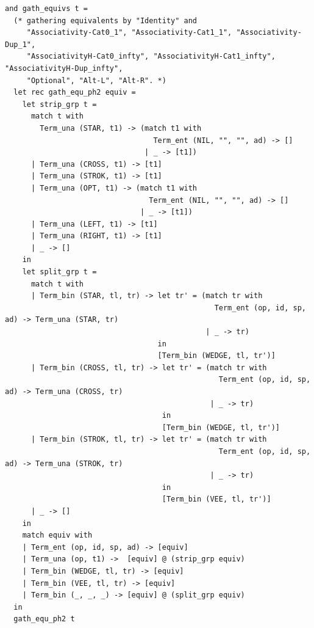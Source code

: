 \documentclass[12pt]{article}
\begin{document}
\begin{tiny}
\begin{verbatim}
and gath_equivs t =
  (* gathering equivalents by "Identity" and
     "Associativity-Cat0_1", "Associativity-Cat1_1", "Associativity-Dup_1",
     "AssociativityH-Cat0_infty", "AssociativityH-Cat1_infty", "AssociativityH-Dup_infty",
     "Optional", "Alt-L", "Alt-R". *)
  let rec gath_equ_ph2 equiv =
    let strip_grp t =
      match t with
        Term_una (STAR, t1) -> (match t1 with
                                  Term_ent (NIL, "", "", ad) -> []
                                | _ -> [t1])
      | Term_una (CROSS, t1) -> [t1]
      | Term_una (STROK, t1) -> [t1]
      | Term_una (OPT, t1) -> (match t1 with
                                 Term_ent (NIL, "", "", ad) -> []
                               | _ -> [t1])
      | Term_una (LEFT, t1) -> [t1]
      | Term_una (RIGHT, t1) -> [t1]
      | _ -> []
    in
    let split_grp t =
      match t with
      | Term_bin (STAR, tl, tr) -> let tr' = (match tr with
                                                Term_ent (op, id, sp, ad) -> Term_una (STAR, tr)
                                              | _ -> tr)
                                   in
                                   [Term_bin (WEDGE, tl, tr')]
      | Term_bin (CROSS, tl, tr) -> let tr' = (match tr with
                                                 Term_ent (op, id, sp, ad) -> Term_una (CROSS, tr)
                                               | _ -> tr)
                                    in
                                    [Term_bin (WEDGE, tl, tr')]
      | Term_bin (STROK, tl, tr) -> let tr' = (match tr with
                                                 Term_ent (op, id, sp, ad) -> Term_una (STROK, tr)
                                               | _ -> tr)
                                    in
                                    [Term_bin (VEE, tl, tr')]                                   
      | _ -> []
    in
    match equiv with
    | Term_ent (op, id, sp, ad) -> [equiv]
    | Term_una (op, t1) ->  [equiv] @ (strip_grp equiv)
    | Term_bin (WEDGE, tl, tr) -> [equiv]
    | Term_bin (VEE, tl, tr) -> [equiv]
    | Term_bin (_, _, _) -> [equiv] @ (split_grp equiv)
  in
  gath_equ_ph2 t



\end{verbatim}
\end{tiny}
\end{document}
